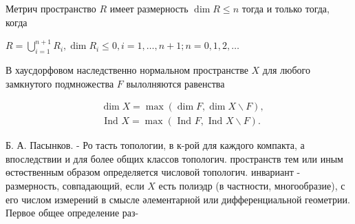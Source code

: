 \documentclass[10pt]{article}
\begin{document}
Метрич пространство $R$ имеет размерность $\operatorname{dim} R \leqslant n$ тогда и только тогда, когда



$R=\bigcup_{i=1}^{n+1} R_{i}, \operatorname{dim} R_{i} \leqslant 0, i=1, \ldots, n+1 ; n=0,1,2, \ldots$



В хаусдорфовом наследственно нормальном пространстве $X$ для любого замкнутого подмножества $F$ вылолняются равенства



\[

\begin{aligned}

& \operatorname{dim} X=\max (\operatorname{dim} F, \operatorname{dim} X \backslash F), \\

& \text { Ind } X=\max (\text { Ind } F, \text { Ind } X \backslash F) .

\end{aligned}

\]



Б. А. Пасынков. - Ро тасть топологии, в к-рой для каждого компакта, а впоследствии и для более общих классов топологич. пространств тем или иным өстөственным образом определяется числовой топологич. инвариант - размерность, совпадающий, если $X$ есть полиэдр (в частности, многообразие), с его числом измерений в смысле әлементарной или дифференциальной геометрии. Первое общее определение раз-
\end{document}
